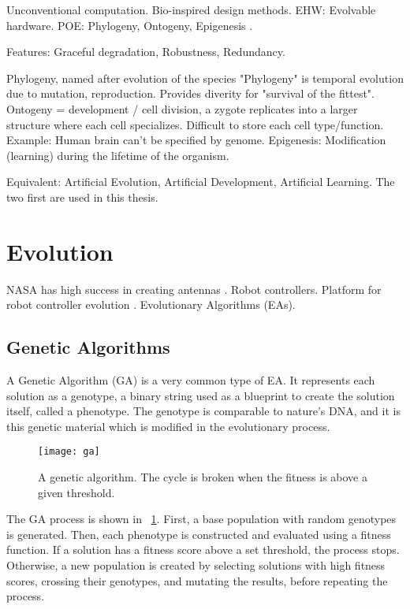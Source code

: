 \TODO
Unconventional computation.
Bio-inspired design methods.
EHW: Evolvable hardware.
POE: Phylogeny, Ontogeny, Epigenesis \cite{sipper1997poe}.

Features: Graceful degradation, Robustness, Redundancy.

\TODO
Phylogeny, named after evolution of the species "Phylogeny" is temporal evolution due to mutation, reproduction.
Provides diverity for "survival of the fittest".
Ontogeny = development / cell division, a zygote replicates into a larger structure where each cell specializes.
Difficult to store each cell type/function.
Example: Human brain can't be specified by genome.
Epigenesis: Modification (learning) during the lifetime of the organism.

\TODO
Equivalent: Artificial Evolution, Artificial Development, Artificial Learning.
The two first are used in this thesis.


\section{Evolution}

\TODO
NASA has high success in creating antennas \cite{hornby2006antenna}.
Robot controllers.
Platform for robot controller evolution \cite{haddow1999robot}.
Evolutionary Algorithms (EAs).

\subsection{Genetic Algorithms}

A Genetic Algorithm (GA) is a very common type of EA.
It represents each solution as a genotype, a binary string used as a blueprint to create the solution itself, called a phenotype.
The genotype is comparable to nature's DNA, and it is this genetic material which is modified in the evolutionary process.

\begin{figure}[!ht]
    \centering
    \texttt{[image: ga]}
    \caption[Genetic Algorithm]{
        A genetic algorithm.
        The cycle is broken when the fitness is above a given threshold.
    }
    \label{fig:ga}
\end{figure}

The GA process is shown in \figurename~\ref{fig:ga}.
First, a base population with random genotypes is generated.
Then, each phenotype is constructed and evaluated using a fitness function.
If a solution has a fitness score above a set threshold, the process stops.
Otherwise, a new population is created by selecting solutions with high fitness scores, crossing their genotypes, and mutating the results, before repeating the process.

